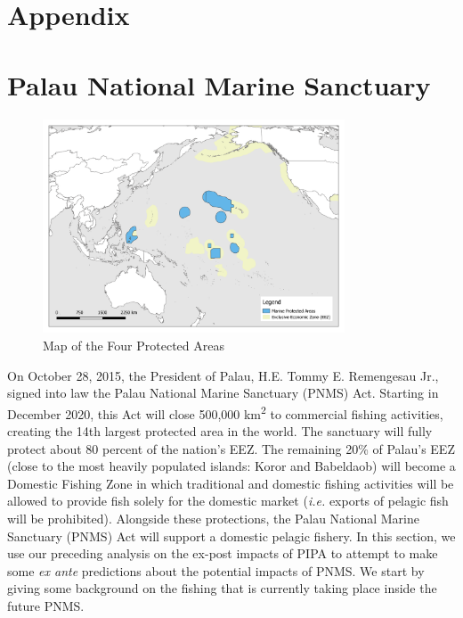 \documentclass[9pt,twoside,lineno]{pnas-new}
\begin{document}

\clearpage

\FloatBarrier

\section{Appendix}\label{appendix}

\newcommand{\beginsupplement}{\setcounter{table}{0}  \renewcommand{\thetable}{S\arabic{table}} \setcounter{figure}{0} \renewcommand{\thefigure}{S\arabic{figure}}}

\setcounter{table}{0}  \renewcommand{\thetable}{S\arabic{table}} \setcounter{figure}{0} \renewcommand{\thefigure}{S\arabic{figure}}


\section{Palau National Marine Sanctuary}\label{PNMS}

\begin{figure}[h]
	\includegraphics[width=0.8\textwidth]{img/Color_V1.png}
	\caption{Map of the Four Protected Areas}
	\label{fig:maps}
\end{figure}

On October 28, 2015, the President of Palau, H.E. Tommy E. Remengesau Jr., signed into law the Palau National Marine Sanctuary (PNMS) Act. Starting in December 2020, this Act will close 500,000 km\textsuperscript{2} to commercial fishing activities, creating the 14th largest protected area in the world. The sanctuary will fully protect about 80 percent of the nation’s EEZ. The remaining 20\% of Palau’s EEZ (close to the most heavily populated islands: Koror and Babeldaob) will become a Domestic Fishing Zone in which traditional and domestic fishing activities will be allowed to provide fish solely for the domestic market (\emph{i.e.} exports of pelagic fish will be prohibited). Alongside these protections, the Palau National Marine Sanctuary (PNMS) Act will support a domestic pelagic fishery. In this section, we use our preceding analysis on the ex-post impacts of PIPA to attempt to make some \emph{ex ante} predictions about the potential impacts of PNMS. We start by giving some background on the fishing that is currently taking place inside the future PNMS. 
\end{document}
